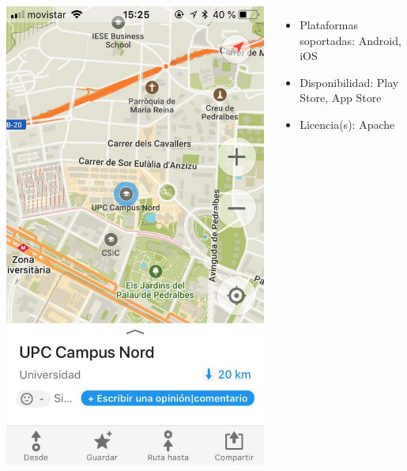 \begin{frame}
\begin{columns}[c]
\begin{center}
                \includegraphics[height=0.5\textheight]{images/mapsme-screencap.jpg}
            \end{center}
            \begin{itemize}
                \item Plataformas soportadas: Android, iOS
                \item Disponibilidad: Play Store, App Store
                \item Licencia(s): Apache
            \end{itemize}
    \end{columns}

\end{frame}

